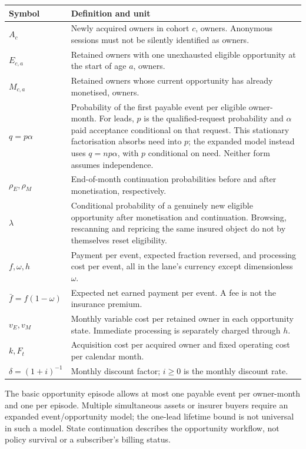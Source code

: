 \documentclass[11pt,a4paper]{article}
\begin{document}
\begin{longtable}{@{}p{25mm}p{118mm}@{}}
\toprule Symbol & Definition and unit \\
\midrule\endhead
$A_c$ & Newly acquired owners in cohort $c$, owners. Anonymous sessions must not be silently identified as owners.\\
$E_{c,a}$ & Retained owners with one unexhausted eligible opportunity at the start of age $a$, owners.\\
$M_{c,a}$ & Retained owners whose current opportunity has already monetised, owners.\\
$q=p\alpha$ & Probability of the first payable event per eligible owner-month. For leads, $p$ is the qualified-request probability and $\alpha$ paid acceptance conditional on that request. This stationary factorisation absorbs need into $p$; the expanded model instead uses $q=n p\alpha$, with $p$ conditional on need. Neither form assumes independence.\\
$\rho_E,\rho_M$ & End-of-month continuation probabilities before and after monetisation, respectively.\\
$\lambda$ & Conditional probability of a genuinely new eligible opportunity after monetisation and continuation. Browsing, rescanning and repricing the same insured object do not by themselves reset eligibility.\\
$f,\omega,h$ & Payment per event, expected fraction reversed, and processing cost per event, all in the lane's currency except dimensionless $\omega$.\\
$\bar f=f(1-\omega)$ & Expected net earned payment per event. A fee is not the insurance premium.\\
$v_E,v_M$ & Monthly variable cost per retained owner in each opportunity state. Immediate processing is separately charged through $h$.\\
$k,F_t$ & Acquisition cost per acquired owner and fixed operating cost per calendar month.\\
$\delta=(1+i)^{-1}$ & Monthly discount factor; $i\geq0$ is the monthly discount rate.\\
\bottomrule
\end{longtable}

The basic opportunity episode allows at most one payable event per owner-month and one per episode. Multiple simultaneous assets or insurer buyers require an expanded event/opportunity model; the one-lead lifetime bound is not universal in such a model. State continuation describes the opportunity workflow, not policy survival or a subscriber's billing status.
\end{document}
